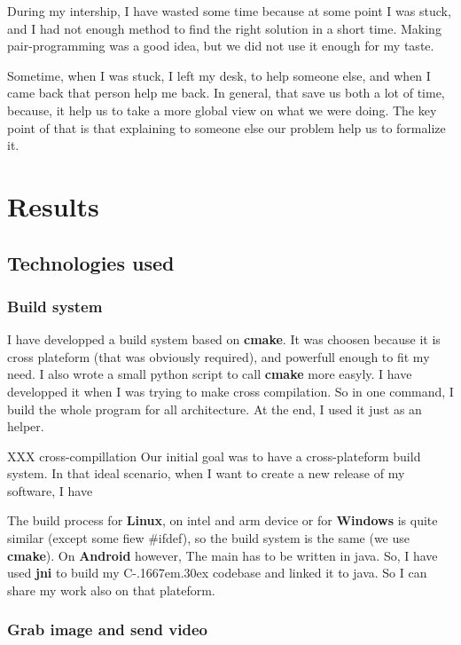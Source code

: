 \documentclass[a4paper,11pt]{custom}
\newcommand{\cmake}{\textbf{cmake}}
\newcommand{\jni}{\textbf{jni}}
\newcommand{\linux}{\textbf{Linux}}
\newcommand{\win}{\textbf{Windows}}
\newcommand{\android}{\textbf{Android}}
\newcommand{\cpp}{%
  C\kern-.1667em\raise.30ex\hbox{\smaller{++}}%
  \spacefactor1000%
}
\begin{document}
During my intership, I have wasted some time because at some point I was stuck,
and I had not enough method to find the right solution in a short time. Making
pair-programming was a good idea, but we did not use it enough for my taste.

Sometime, when I was stuck, I left my desk, to help someone else, and when I
came back that person help me back. In general, that save us both a lot of time,
because, it help us to take a more global view on what we were doing. The key
point of that is that explaining to someone else our problem help us to
formalize it.

\chapter{Results}

\section{Technologies used}

\subsection{Build system}

I have developped a build system based on \cmake. It was choosen because it is
cross plateform (that was obviously required), and powerfull enough to fit my
need. I also wrote a small python script to call \cmake{} more easyly. I have
developped it when I was trying to make cross compilation. So in one command, I
build the whole program for all architecture. At the end, I used it just as an
helper.

XXX
cross-compillation
Our initial goal was to have a cross-plateform build system. In that ideal
scenario, when I want to create a new release of my software, I have

The build process for \linux, on intel and arm device or for \win{} is quite
similar (except some fiew \#ifdef), so the build system is the same (we use
\cmake). On \android{} however, The main has to be written in java. So, I have
used \jni{} to build my \cpp{} codebase and linked it to java. So I can share my
work also on that plateform.

\subsection{Grab image and send video}
\end{document}
